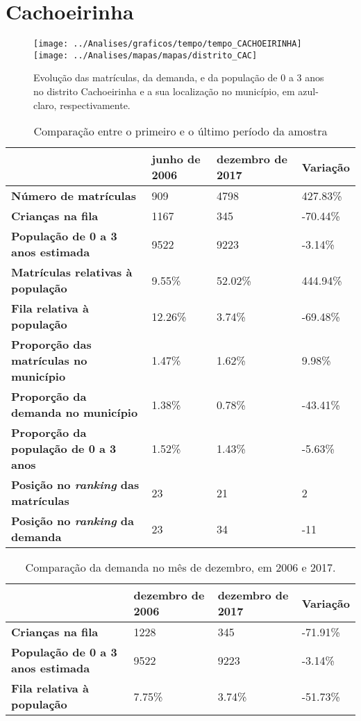\section{Cachoeirinha}
\begin{figure}[H]
\centering
\texttt{[image: ../Analises/graficos/tempo/tempo\_CACHOEIRINHA]}
\texttt{[image: ../Analises/mapas/mapas/distrito\_CAC]}
\caption{Evolução das matrículas, da demanda, e da população de 0 a 3 anos no distrito Cachoeirinha e a sua localização no município, em azul-claro, respectivamente.}
\end{figure}
\begin{table}[H]
\begin{tabular}{l|l|l|l}
\textbf{}                                      & \textbf{junho de 2006}       & \textbf{dezembro de 2017}    & \textbf{Variação} \\ \hline
\textbf{Número de matrículas}                  & 909 & 4798 & 427.83\% \\ \hline
\textbf{Crianças na fila}                      & 1167 & 345 & -70.44\% \\ \hline
\textbf{População de 0 a 3 anos estimada}      & 9522 & 9223 & -3.14\% \\ \hline
\textbf{Matrículas relativas à população}      & 9.55\% & 52.02\% & 444.94\% \\ \hline
\textbf{Fila relativa à população}             & 12.26\% & 3.74\% & -69.48\% \\ \hline
\textbf{Proporção das matrículas no município} & 1.47\% & 1.62\% & 9.98\% \\ \hline
\textbf{Proporção da demanda no município}     & 1.38\% & 0.78\% & -43.41\% \\ \hline
\textbf{Proporção da população de 0 a 3 anos}  & 1.52\% & 1.43\% & -5.63\% \\ \hline
\textbf{Posição no \textit{ranking} das matrículas}     & 23 & 21 & 2 \\ \hline
\textbf{Posição no \textit{ranking} da demanda}         & 23 & 34 & -11 \\ 
\end{tabular}
\caption{Comparação entre o primeiro e o último período da amostra}
\end{table}
\begin{table}[H]
\begin{tabular}{l|l|l|l}
\textbf{}                                 & \textbf{dezembro de 2006} & \textbf{dezembro de 2017} & \textbf{Variação} \\ \hline
\textbf{Crianças na fila}                      & 1228 & 345 & -71.91\% \\ \hline
\textbf{População de 0 a 3 anos estimada}      & 9522 & 9223 & -3.14\% \\ \hline
\textbf{Fila relativa à população}             & 7.75\% & 3.74\% & -51.73\% \\
\end{tabular}
\caption{Comparação da demanda no mês de dezembro, em 2006 e 2017.}
\end{table}
